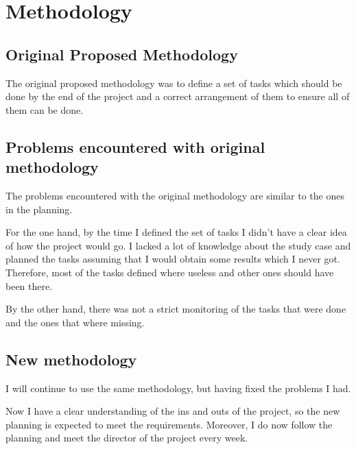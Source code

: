 \documentclass{article}
\begin{document}
\section{Methodology}
    \subsection{Original Proposed Methodology}
    The original proposed methodology was to define a set of tasks which should
    be done by the end of the project and a correct arrangement of them to
    ensure all of them can be done.
    \subsection{Problems encountered with original methodology}
    The problems encountered with the original methodology are similar to the
    ones in the planning.

    For the one hand, by the time I defined the set of tasks I didn't have a
    clear idea of how the project would go. I lacked a lot of knowledge about
    the study case and planned the tasks assuming that I would obtain some results
    which I never got. Therefore, most of the tasks defined where useless and
    other ones should have been there.

    By the other hand, there was not a strict monitoring of the tasks that were
    done  and the ones that where missing.
    \subsection{New methodology}

    I will continue to use the same methodology, but having fixed the problems
    I had.

    Now I have a clear understanding of the ins and outs of the project, so the
    new planning is expected to meet the requirements. Moreover, I do
    now follow the planning and meet the director of the project every week.


%
%
%
%
\end{document}
